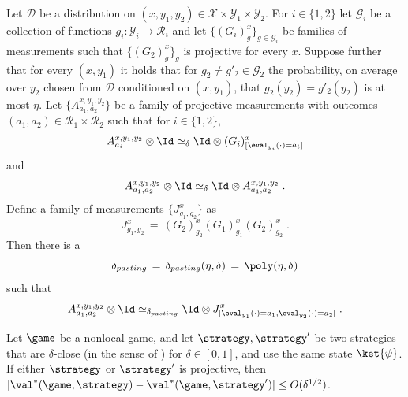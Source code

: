 \begin{lemma}\label{lem:pasting}
Let $\mathcal{D}$ be a distribution on $(x,y_1,y_2)\in \mathcal{X}\times \mathcal{Y}_1\times \mathcal{Y}_2$. For $i\in \{1,2\}$ let $\mathcal{G}_i$ be a collection of functions $g_i: \mathcal{Y}_i \to \mathcal{R}_i$ and let $\{(G_i)^{x}_{g}\}_{g\in \mathcal{G}_i}$ be families of measurements such that $\{(G_2)^x_g\}_g$ is projective for every $x$. Suppose further that for every $(x,y_1)$ it holds that for $g_2\neq g'_2 \in \mathcal{G}_2$ the probability, on average over $y_2$ chosen from $\mathcal{D}$ conditioned on $(x,y_1)$, that $g_2(y_2)=g'_2(y_2)$  is at most $\eta$. 
Let $\{A^{x,y_1,y_2}_{a_1,a_2}\}$ be a family of projective measurements with outcomes $(a_1,a_2)\in \mathcal{R}_1 \times \mathcal{R}_2$ such that for $i\in \{1,2\}$,
\begin{equation}\label{eq:pasting-1}
 A^{x,y_1,y_2}_{a_i} \otimes \Id \simeq_\delta \Id \otimes (G_i)^x_{[\eval_{y_i}(\cdot)=a_i]}
\end{equation}
and 
\begin{equation}\label{eq:pasting-2}
 A^{x,y_1,y_2}_{a_1,a_2} \otimes \Id \simeq_\delta \Id \otimes  A^{x,y_1,y_2}_{a_1,a_2}\;.
\end{equation}
Define a family of measurements $\{J^x_{g_1,g_2}\}$ as
\begin{equation}\label{eq:pasting-2a}
 J^x_{g_1,g_2} \,=\, (G_2)^x_{g_2} (G_1)^x_{g_1} (G_2)^x_{g_2}\;.
\end{equation}
Then there is a 
\begin{equation}\label{eq:def-deltap}
\delta_{pasting} \,=\, \delta_{pasting}(\eta,\delta)\,=\, \poly(\eta,\delta)
\end{equation} such that 
\begin{equation}\label{eq:pasting-3}
 A^{x,y_1,y_2}_{a_1,a_2} \otimes \Id \simeq_{\delta_{pasting}} \Id \otimes J^x_{[\eval_{y_1}(\cdot)=a_1,\eval_{y_2}(\cdot) = a_2]}\;.
\end{equation}
\end{lemma}





\begin{lemma}
  \label{lem:close-strategies-have-close-values}
  Let $\game$ be a nonlocal game, and let $\strategy, \strategy'$ be
  two strategies that are $\delta$-close (in the sense of
  ) for $\delta \in [0,1]$, and use the
  same state $\ket{\psi}$. If either $\strategy$ or $\strategy'$ is
  projective, then $|\val^*(\game,\strategy) - \val^*(\game,
  \strategy')| \leq O(\delta^{1/2})$.
\end{lemma}

